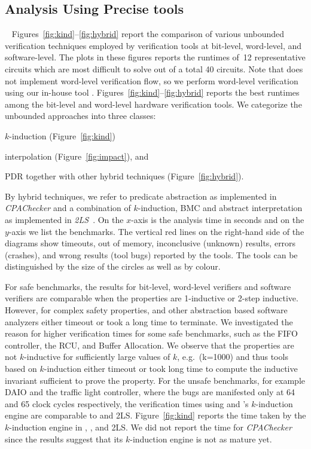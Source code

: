 \subsection{Analysis Using Precise tools}~\label{precise}
%
Figures~\ref{fig:kind}--\ref{fig:hybrid} report the comparison of various unbounded 
verification techniques employed by verification tools at bit-level, word-level, 
and software-level.  The plots in these figures reports the runtimes of~12 
representative circuits which are most difficult to solve out of a total 40 
circuits.  Note that \ABC does not implement word-level verification flow, 
so we perform word-level verification using our in-house tool \ebmc.
Figures~\ref{fig:kind}--\ref{fig:hybrid} reports the best runtimes 
among the bit-level and word-level hardware verification tools.  
%
We categorize the unbounded approaches into three classes:
\begin{compactitem}
\item $k$-induction (Figure~\ref{fig:kind})
\item interpolation (Figure~\ref{fig:impact}), and 
\item PDR together with other hybrid techniques (Figure~\ref{fig:hybrid}).  
\end{compactitem}
By hybrid techniques, we refer to predicate
abstraction as implemented in \emph{CPAChecker} and a combination of
$k$-induction, BMC and abstract interpretation as implemented in
\emph{2LS}~\cite{kiki}.  On the $x$-axis is the analysis time in
seconds and on the $y$-axis we list the benchmarks. The vertical red lines on
the right-hand side of the diagrams show timeouts, out of memory,
inconclusive (unknown) results, errors (crashes), and wrong results
(tool bugs) reported by the tools. The tools can be distinguished 
by the size of the circles as well as by colour. 

 For safe benchmarks, the results
for bit-level, word-level verifiers and software verifiers are
comparable when the properties are 1-inductive or 2-step inductive.
However, for complex safety properties, \ABC and other abstraction
based software analyzers either timeout or took a long time to
terminate.  We investigated the reason for higher verification times
for some safe benchmarks, such as the FIFO controller, the RCU, and Buffer 
Allocation.  We observe that the properties are not $k$-inductive for
sufficiently large values of $k$, e.g.\ (k=1000) and thus tools based
on $k$-induction either timeout or took long time to
compute the inductive invariant sufficient to prove the property. For
the unsafe benchmarks, for example DAIO and the traffic light controller, where
the bugs are manifested only at 64 and 65 clock cycles respectively,
the verification times using \ABC and \ebmc's $k$-induction engine 
are comparable to \cbmcv and \textsc{2LS}. Figure~\ref{fig:kind} 
reports the time taken by the $k$-induction engine in 
\ABC, \ebmcv, \cbmcv and \textsc{2LS}.  We did not report
the time for \emph{CPAChecker} since the results suggest that 
its $k$-induction engine is not as mature yet. 

